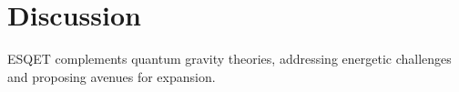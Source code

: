 \chapter{Discussion}

ESQET complements quantum gravity theories, addressing energetic challenges and proposing avenues for expansion.
